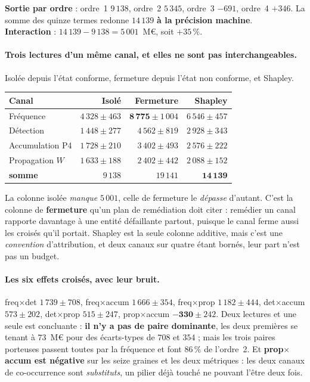 \documentclass[11pt,a4paper]{article}
\begin{document}
\begin{res}
\textbf{Sortie par ordre} : ordre~1 $9\,138$, ordre~2 $5\,345$, ordre~3 $-691$, ordre~4 $+346$.
La somme des quinze termes redonne $14\,139$ \textbf{à la précision machine}.\\
\textbf{Interaction} : $14\,139 - 9\,138 = 5\,001$~M\euro, soit $+35\,\%$.
\end{res}

\paragraph{Trois lectures d'un même canal, et elles ne sont pas interchangeables.} Isolée depuis
l'état conforme, fermeture depuis l'état non conforme, et Shapley.

\begin{center}\footnotesize
\renewcommand{\arraystretch}{1.15}
\begin{tabular}{@{}l r r r@{}}
\toprule
\textbf{Canal} & \textbf{Isolé} & \textbf{Fermeture} & \textbf{Shapley} \\
\midrule
Fréquence & $4\,328 \pm 463$ & $\mathbf{8\,775} \pm 1\,004$ & $6\,546 \pm 457$ \\
Détection & $1\,448 \pm 277$ & $4\,562 \pm 819$ & $2\,928 \pm 343$ \\
Accumulation P4 & $1\,728 \pm 210$ & $3\,402 \pm 493$ & $2\,576 \pm 222$ \\
Propagation $W$ & $1\,633 \pm 188$ & $2\,402 \pm 442$ & $2\,088 \pm 152$ \\
\midrule
\textbf{somme} & $9\,138$ & $19\,141$ & $\mathbf{14\,139}$ \\
\bottomrule
\end{tabular}
\end{center}

\vspace{2pt}
\noindent La colonne isolée \emph{manque} $5\,001$, celle de fermeture le \emph{dépasse}
d'autant. C'est la colonne de \textbf{fermeture} qu'un plan de remédiation doit citer : remédier
un canal rapporte davantage à une entité défaillante partout, puisque le canal ferme aussi les
croisés qu'il portait. Shapley est la seule colonne additive, mais c'est une \emph{convention}
d'attribution, et deux canaux sur quatre étant bornés, leur part n'est pas un budget.

\paragraph{Les six effets croisés, avec leur bruit.} freq$\times$det $1\,739 \pm 708$,
freq$\times$accum $1\,666 \pm 354$, freq$\times$prop $1\,182 \pm 444$, det$\times$accum
$573 \pm 202$, det$\times$prop $515 \pm 247$, prop$\times$accum $\mathbf{-330} \pm 242$.
Deux lectures et une seule est concluante : \textbf{il n'y a pas de paire dominante}, les deux
premières se tenant à $73$~M\euro{} pour des écarts-types de $708$ et $354$ ; mais les trois
paires porteuses passent toutes par la fréquence et font $86\,\%$ de l'ordre~2. Et
\textbf{prop$\times$accum est négative} sur les seize graines et les deux métriques : les deux
canaux de co-occurrence sont \emph{substituts}, un pilier déjà touché ne pouvant l'être deux
fois.
\end{document}
